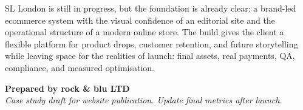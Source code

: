 \documentclass[11pt,a4paper]{article}
\newcommand{\project}{SL London}
\newcommand{\studio}{rock \& blu LTD}
\begin{document}
\project{} is still in progress, but the foundation is already clear: a brand-led ecommerce system with the visual confidence of an editorial site and the operational structure of a modern online store. The build gives the client a flexible platform for product drops, customer retention, and future storytelling while leaving space for the realities of launch: final assets, real payments, QA, compliance, and measured optimisation.

\vfill

\begin{center}
    \textbf{Prepared by \studio}\\
    \textit{Case study draft for website publication. Update final metrics after launch.}
\end{center}
\end{document}
